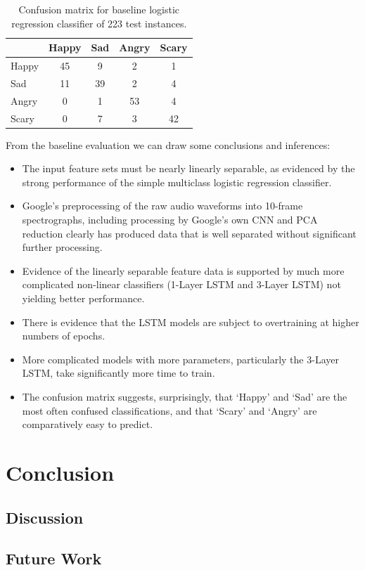 \documentclass{article}
\begin{document}
\begin{table}[] 
\caption{Confusion matrix for baseline logistic regression classifier of 223 test instances.}
\label{tbl:baseline_conf}
\centering
\begin{tabular}{lcccc} 
\toprule
\hline
 & Happy & Sad & Angry & Scary \\ 
\midrule
Happy & 45 &  9 & 2 & 1 \\
Sad   &  11 & 39 & 2 & 4 \\
Angry &  0 &  1 & 53 & 4 \\
Scary &  0 &  7 & 3 &  42 \\
\bottomrule
\end{tabular}
\end{table}

From the baseline evaluation we can draw some conclusions and inferences:
\begin{itemize}
\item The input feature sets must be nearly linearly separable, as evidenced by the strong performance of the simple multiclass logistic regression classifier.
\item Google’s preprocessing of the raw audio waveforms into 10-frame spectrographs, including processing by Google’s own CNN and PCA reduction clearly has produced data that is well separated without significant further processing.
\item Evidence of the linearly separable feature data is supported by much more complicated non-linear classifiers (1-Layer LSTM and 3-Layer LSTM) not yielding better performance.
\item There is evidence that the LSTM models are subject to overtraining at higher numbers of epochs.
\item More complicated models with more parameters, particularly the 3-Layer LSTM, take significantly more time to train.
\item The confusion matrix suggests, surprisingly, that ‘Happy’ and ‘Sad’ are the most often confused classifications, and that ‘Scary’ and ‘Angry’ are comparatively easy to predict.
\end{itemize}


\section{Conclusion}

\subsection{Discussion}

\subsection{Future Work}
  
 

\end{document}
